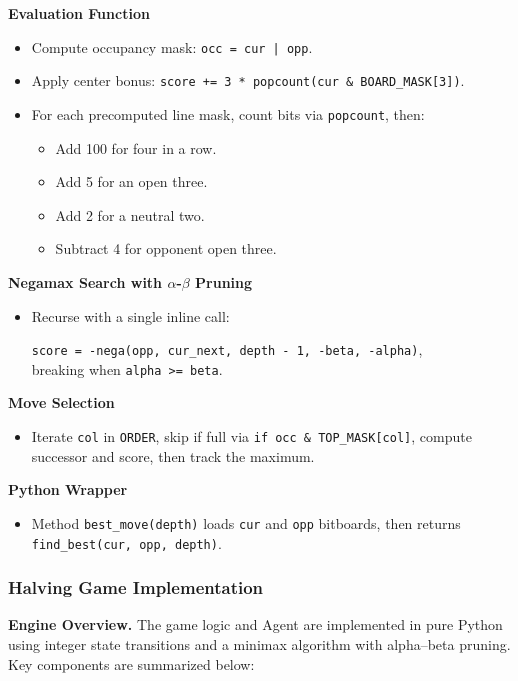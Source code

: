 \documentclass[12pt]{article}
\begin{document}
\noindent\textbf{Evaluation Function}
\begin{itemize}
  \item Compute occupancy mask: \texttt{occ = cur | opp}.
  \item Apply center bonus: \texttt{score += 3 * popcount(cur \& BOARD\_MASK[3])}.
  \item For each precomputed line mask, count bits via \texttt{popcount}, then:
    \begin{itemize}
      \item Add 100 for four in a row.
      \item Add 5 for an open three.
      \item Add 2 for a neutral two.
      \item Subtract 4 for opponent open three.
    \end{itemize}
\end{itemize}

\noindent\textbf{Negamax Search with \(\alpha\)-\(\beta\) Pruning}
\begin{itemize}
  \item Recurse with a single inline call:
        \begin{center}
        \texttt{score = -nega(opp, cur\_next, depth - 1, -beta, -alpha)}, \\ breaking when
        \texttt{alpha >= beta}.
        \end{center}
\end{itemize}

\noindent\textbf{Move Selection}
\begin{itemize}
  \item Iterate \texttt{col} in \texttt{ORDER}, skip if full via \texttt{if occ \& TOP\_MASK[col]}, compute successor and score, then track the maximum.
\end{itemize}

\noindent\textbf{Python Wrapper}
\begin{itemize}
  \item Method \texttt{best\_move(depth)} loads \texttt{cur} and \texttt{opp} bitboards, then returns \texttt{find\_best(cur, opp, depth)}.
\end{itemize}

\subsubsection{Halving Game Implementation}

\textbf{Engine Overview.}  
The game logic and Agent are implemented in pure Python using integer state transitions and a minimax algorithm with alpha–beta pruning. Key components are summarized below:
\end{document}

